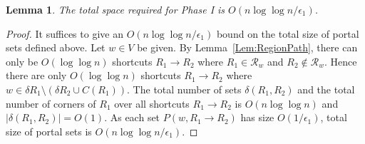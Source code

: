 \documentclass[11pt]{article}
\newtheorem{lemma}{Lemma}
\begin{document}
\begin{lemma}\label{Lem:TypeIPortalSet}
The total space required for Phase I is $O(n\log\log n/\epsilon_1)$.
\end{lemma}
\begin{proof}
It suffices to give an $O(n\log\log n/\epsilon_1)$ bound on the total size of portal sets defined above. Let $w\in V$ be given. By Lemma~\ref{Lem:RegionPath}, there can only be $O(\log\log n)$ shortcuts $R_1\rightarrow R_2$ where $R_1\in\mathcal R_w$ and $R_2\notin\mathcal R_w$. Hence there are only $O(\log\log n)$ shortcuts $R_1\rightarrow R_2$ where $w\in\delta R_1\setminus(\delta R_2\cup C(R_1))$. The total number of sets $\delta(R_1,R_2)$ and the total number of corners of $R_1$ over all shortcuts $R_1\rightarrow R_2$ is $O(n\log\log n)$ and $|\delta(R_1,R_2)| = O(1)$. As each set $P(w,R_1\rightarrow R_2)$ has size $O(1/\epsilon_1)$, total size of portal sets is $O(n\log\log n/\epsilon_1)$.
\end{proof}
\end{document}
